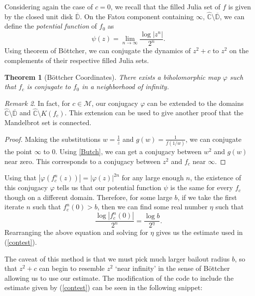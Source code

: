 \documentclass{amsart}
\newcommand{\bbC}{\mathbb{C}}
\newcommand{\cal}[1]{ \mathcal{#1}}
\newcommand{\bbCS}{\hat{\bbC}}
\newcommand{\Mand}{\cal{M}}
\newcommand{\abs}[1]{ \left| #1 \right| }
\renewcommand{\phi}{\varphi}
\newtheorem{thm}{Theorem}[section]
\theoremstyle{definition}
\theoremstyle{remark}
\newtheorem{rem}[thm]{Remark}
\numberwithin{equation}{section}
\begin{document}
Considering again the case of $c=0$, we recall that the filled Julia set of $f$ is given by the closed unit disk $\overline{\mathbb{D}}$. On the Fatou component containing $\infty$, $\bbCS\setminus \overline{\mathbb{D}}$, we can define the \emph{potential function} of $f_0$ as
\begin{equation}
  \psi(z)=\lim\limits_{n\to\infty}\frac{\log \abs{z^n}}{2^n}.
\end{equation}
Using theorem of B\"ottcher, we can conjugate the dynamics of $z^2+c$ to $z^2$ on the complements of their respective filled Julia sets.
\begin{thm}[B\"ottcher Coordinates]
  There exists a biholomorphic map $\phi$ such that $f_c$ is conjugate to $f_0$ in a neighborhood of infinity.
\end{thm}
\begin{rem}
  In fact, for $c\in \Mand$, our conjugacy $\phi$ can be extended to the domains $\bbCS\setminus \overline{\mathbb{D}}$ and $\bbCS\setminus K(f_c)$. This extension can be used to give another proof that the Mandelbrot set is connected.
\end{rem}
\begin{proof}
Making the substitutions $w=\frac{1}{z}$ and $g(w)=\frac{1}{f(1/w)}$, we can conjugate the point $\infty$ to 0. Using \cref{Butch}, we can get a conjugacy between $w^2$ and $g(w)$ near zero. This corresponds to a conjugacy between $z^2$ and $f_c$ near $\infty$.
\end{proof}

Using that $\abs{\phi (f_c^n (z))}=\abs{\phi(z)}^{2n}$ for any large enough $n$, the existence of this conjugacy $\phi$ tells us that our potential function $\psi$ is the same for every $f_c$ though on a different domain. Therefore, for some large $b$, if we take the first iterate $n$ such that $f_c^n(0)>b$, then we can find some real number $\eta$ such that
\begin{equation}
  \frac{\log \abs{f_c^n(0)}}{2^n}=\frac{\log b}{2^{\eta}}.
\end{equation}
Rearranging the above equation and solving for $\eta$ gives us the estimate used in (\ref{contest}).

The caveat of this method is that we must pick much larger bailout radius $b$, so that $z^2+c$ can begin to resemble $z^2$ `near infinity' in the sense of B\"ottcher allowing us to use our estimate.
The modification of the code to include the estimate given by (\ref{contest}) can be seen in the following snippet:
\end{document}

